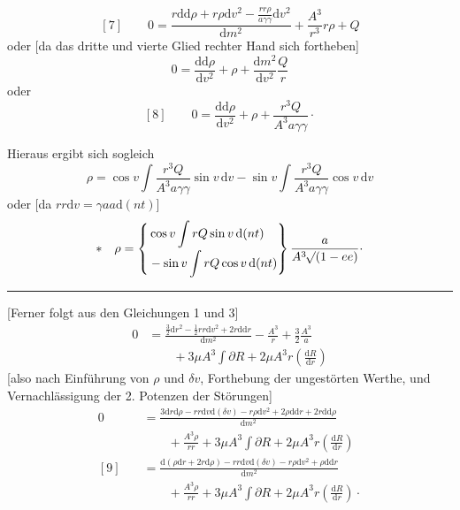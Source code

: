 \[
[7]\qquad 0=\frac{r\mathrm{d}\mathrm{d}\rho+r\rho\mathrm{d}v^{2}-\frac{rr\rho}{a\gamma\gamma}\mathrm{d}v^{2}}{\mathrm{d}m^{2}}+\frac{A^{3}}{r^{3}}r\rho+Q
\]
oder [da das dritte und vierte Glied rechter Hand sich fortheben]
\[
0=\frac{\mathrm{d}\mathrm{d}\rho}{\mathrm{d}v^{2}}+\rho+\frac{\mathrm{d}m^{2}}{\mathrm{d}v^{2}}\frac{Q}{r}
\]
oder
\[
[8]\qquad 0=\frac{\mathrm{d}\mathrm{d}\rho}{\mathrm{d}v^{2}}+\rho+\frac{r^{3}Q}{A^{3}a\gamma\gamma}\mathpunct{\cdot}
\]
\par
\noindent\hspace*{\parindent}Hieraus ergibt sich sogleich
\[
\rho=\cos v\int\frac{r^{3}Q}{A^{3}a\gamma\gamma}\sin v\,\mathrm{d}v-\sin v\int\frac{r^{3}Q}{A^{3}a\gamma\gamma}\cos v\,\mathrm{d}v
\]
oder [da \(rr\mathrm{d}v=\gamma aa\mathrm{d}(nt)\)]
\[
*\quad\rho=\left\{\begin{aligned}&\cos v\int rQ\sin v\,\mathrm{d}(nt)\\[-2pt]&-\sin v\int rQ\cos v\,\mathrm{d}(nt)\end{aligned}\right\}\frac{a}{A^{3}\mathord{{}^{}\!\surd}(1-ee)}\mathpunct{\cdot}
\]
\par\medskip
\begin{center}\rule{.27\linewidth}{.4pt}\end{center}
\par
\noindent\hspace*{\parindent}[Ferner folgt aus den Gleichungen 1 und 3]
\[
\begin{aligned}
0&=\frac{\frac32\mathrm{d}r^{2}-\frac12rr\mathrm{d}v^{2}+2r\mathrm{d}\mathrm{d}r}{\mathrm{d}m^{2}}-\frac{A^{3}}{r}+\frac32\frac{A^{3}}{a}\\
&\qquad+3\mu A^{3}\int\partial R+2\mu A^{3}r\left(\frac{\mathrm{d}R}{\mathrm{d}r}\right)
\end{aligned}
\]
[also nach Einführung von \(\rho\) und \(\delta v\), Forthebung der ungestörten Werthe, und Vernachlässigung der 2. Potenzen der Störungen]
\[
\begin{aligned}
0&=\frac{3\mathrm{d}r\mathrm{d}\rho-rr\mathrm{d}v\mathrm{d}(\delta v)-r\rho\mathrm{d}v^{2}+2\rho\mathrm{d}\mathrm{d}r+2r\mathrm{d}\mathrm{d}\rho}{\mathrm{d}m^{2}}\\
&\qquad+\frac{A^{3}\rho}{rr}+3\mu A^{3}\int\partial R+2\mu A^{3}r\left(\frac{\mathrm{d}R}{\mathrm{d}r}\right)\\[6pt]
[9]\quad&=\frac{\mathrm{d}(\rho\mathrm{d}r+2r\mathrm{d}\rho)-rr\mathrm{d}v\mathrm{d}(\delta v)-r\rho\mathrm{d}v^{2}+\rho\mathrm{d}\mathrm{d}r}{\mathrm{d}m^{2}}\\
&\qquad+\frac{A^{3}\rho}{rr}+3\mu A^{3}\int\partial R+2\mu A^{3}r\left(\frac{\mathrm{d}R}{\mathrm{d}r}\right)\mathpunct{\cdot}
\end{aligned}
\]

